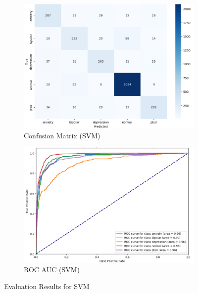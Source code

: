 \vspace{0.25em}

\begin{figure}[h!]
    \centering
    \begin{subfigure}[b]{0.49\textwidth}
        \centering
        \includegraphics[width=\textwidth]{Images/SVM Confusion Matrix.png}
        \caption{Confusion Matrix (SVM)}
        \label{SVMCM}  %
    \end{subfigure}
    \hfill
    \begin{subfigure}[b]{0.49\textwidth}
        \centering
        \includegraphics[width=\textwidth]{Images/SVM ROC.png}
        \caption{ROC AUC (SVM)}
        \label{SVMROC}  %
    \end{subfigure}
    \caption{Evaluation Results for SVM}
    \label{fig:svm_comparison}
\end{figure}

